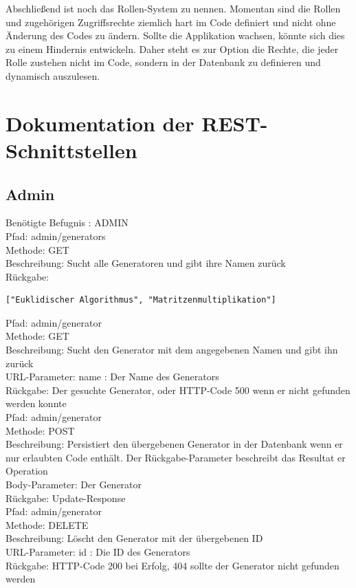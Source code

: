 Abschließend ist noch das Rollen-System zu nennen. Momentan sind die Rollen und zugehörigen Zugriffsrechte ziemlich hart im Code definiert und nicht ohne Änderung des Codes zu ändern. Sollte die Applikation wachsen, könnte sich dies zu einem Hindernis entwickeln. Daher steht es zur Option die Rechte, die jeder Rolle zustehen nicht im Code, sondern in der Datenbank zu definieren und dynamisch auszulesen.

\appendix
\chapter{Dokumentation der REST-Schnittstellen}

\section{Admin}


Benötigte Befugnis : ADMIN \\

\noindent Pfad: admin/generators \\
Methode: GET \\
Beschreibung: Sucht alle Generatoren und gibt ihre Namen zurück \\
Rückgabe: \begin{lstlisting} 
["Euklidischer Algorithmus", "Matritzenmultiplikation"]
\end{lstlisting}

\noindent Pfad: admin/generator \\
Methode: GET \\
Beschreibung: Sucht den Generator mit dem angegebenen Namen und gibt ihn zurück \\
URL-Parameter: name : Der Name des Generators \\
Rückgabe: Der gesuchte Generator, oder HTTP-Code 500 wenn er nicht gefunden werden konnte \\

\noindent Pfad: admin/generator \\
Methode: POST \\
Beschreibung: Persistiert den übergebenen Generator in der Datenbank wenn er nur erlaubten Code enthält. Der Rückgabe-Parameter beschreibt das Resultat er Operation \\
Body-Parameter: Der Generator \\
Rückgabe: Update-Response \\

\noindent Pfad: admin/generator \\
Methode: DELETE \\
Beschreibung: Löscht den Generator mit der übergebenen ID \\
URL-Parameter: id : Die ID des Generators\\
Rückgabe: HTTP-Code 200 bei Erfolg, 404 sollte der Generator nicht gefunden werden \\

